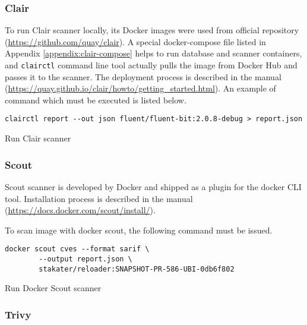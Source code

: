 \subsubsection*{Clair}

To run Clair scanner locally, its Docker images were used from official repository (\url{https://github.com/quay/clair}). A special docker-compose file listed in Appendix \ref{appendix:clair-compose} helps to run database and scanner containers, and \texttt{clairctl} command line tool actually pulls the image from Docker Hub and passes it to the scanner. The deployment process is described in the manual (\url{https://quay.github.io/clair/howto/getting_started.html}). An example of command which must be executed is listed below. 

\begin{listing}[htp]
    \centering
    \begin{minipage}{0.9\linewidth}
        \begin{verbatim}
clairctl report --out json fluent/fluent-bit:2.0.8-debug > report.json
        \end{verbatim}
    \end{minipage}
    \caption{Run Clair scanner}
    \label{lst:clair}
\end{listing}


\subsubsection*{Scout}

Scout scanner is developed by Docker and shipped as a plugin for the docker CLI tool. Installation process is described in the manual (\url{https://docs.docker.com/scout/install/}).

To scan image with docker scout, the following command must be issued.

\begin{listing}[htp]
    \centering
    \begin{minipage}{0.8\linewidth}
        \begin{verbatim}
docker scout cves --format sarif \ 
        --output report.json \
        stakater/reloader:SNAPSHOT-PR-586-UBI-0db6f802
        \end{verbatim}
    \end{minipage}
    \caption{Run Docker Scout scanner}
    \label{lst:scout}
\end{listing}


\subsubsection*{Trivy} 


